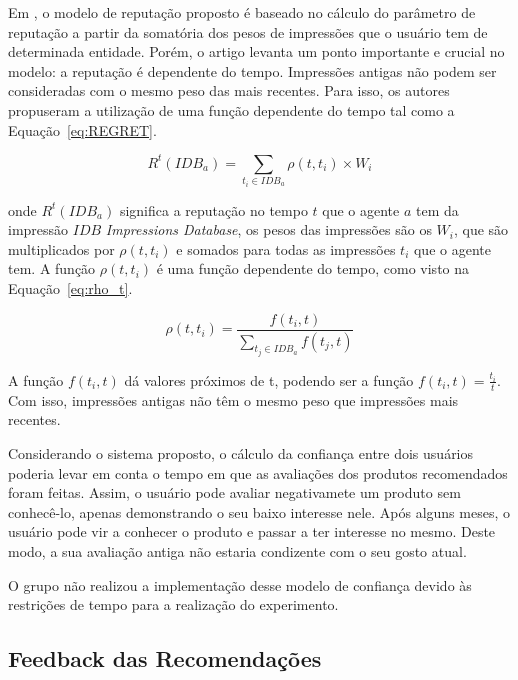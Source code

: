  Em \cite{sabater2001regret}, o modelo de reputação proposto é baseado no cálculo do parâmetro de reputação a partir da somatória dos pesos de impressões que o usuário tem de determinada entidade. Porém, o artigo levanta um ponto importante e crucial no modelo: a reputação é dependente do tempo. Impressões antigas não podem ser consideradas com o mesmo peso das mais recentes. Para isso, os autores propuseram a utilização de uma função dependente do tempo tal como a Equação~\ref{eq:REGRET}.
 
\begin{equation}
 R^t(IDB_a) = {\sum_{t_i\in{IDB_a}}}\rho(t,t_i)\times{W_i}
 \label{eq:REGRET} 
\end{equation}

 onde $R^t(IDB_a)$ significa a reputação no tempo $t$ que o agente $a$ tem da impressão $IDB$ \textit{Impressions Database}, os pesos das impressões são os $W_i$, que são multiplicados por $\rho(t,t_i)$ e somados para todas as impressões $t_i$ que o agente tem. A função $\rho(t,t_i)$ é uma função dependente do tempo, como visto na Equação~\ref{eq:rho_t}.
 
\begin{equation}
 \rho(t,t_i) = \frac{f(t_i,t)}{{\sum_{t_j\in{IDB_a}}}f(t_j,t)}
 \label{eq:rho_t} 
\end{equation}

 A função $f(t_i,t)$ dá valores próximos de t, podendo ser a função $f(t_i,t) = \frac{t_i}{t}$. Com isso, impressões antigas não têm o mesmo peso que impressões mais recentes.

 Considerando o sistema proposto, o cálculo da confiança entre dois usuários poderia levar em conta o tempo em que as avaliações dos produtos recomendados foram feitas. Assim, o usuário pode avaliar negativamete um produto sem conhecê-lo, apenas demonstrando o seu baixo interesse nele. Após alguns meses, o usuário pode vir a conhecer o produto e passar a ter interesse no mesmo. Deste modo, a sua avaliação antiga não estaria condizente com o seu gosto atual.
 
 O grupo não realizou a implementação desse modelo de confiança devido às restrições de tempo para a realização do experimento.


\subsection{Feedback das Recomendações} %
\label{sub:feedback_das_recomendacoes}

